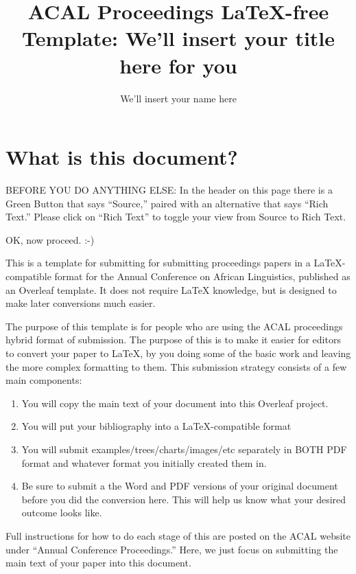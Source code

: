\documentclass[output=paper,colorlinks,citecolor=brown,
]{langscibook}
\author{We'll insert your name here\affiliation{We'll insert your affiliation here}}
\title{ACAL Proceedings LaTeX-free Template: We'll insert your title here for you}
\begin{document}
\maketitle


\section{What is this document?}

BEFORE YOU DO ANYTHING ELSE: In the header on this page there is a Green Button that says ``Source,'' paired with an alternative that says ``Rich Text.'' Please click on ``Rich Text'' to toggle your view from Source to Rich Text. 

OK, now proceed. :-) 

This is a template for submitting for submitting proceedings papers in a LaTeX-compatible format for the Annual Conference on African Linguistics, published as an Overleaf template. It does not require LaTeX knowledge, but is designed to make later conversions much easier.

The purpose of this template is for people who are using the ACAL proceedings hybrid format of submission. The purpose of this is to make it easier for editors to convert your paper to LaTeX, by you doing some of the basic work and leaving the more complex formatting to them. This submission strategy consists of a few main components: 
\begin{enumerate}
\item You will copy the main text of your document into this Overleaf project. 
\item You will put your bibliography into a LaTeX-compatible format
\item You will submit examples/trees/charts/images/etc separately in BOTH PDF format and whatever format you initially created them in. 
\item Be sure to submit a the Word and PDF versions of your original document before you did the conversion here. This will help us know what your desired outcome looks like. 

\end{enumerate}
Full instructions for how to do each stage of this are posted on the ACAL website under ``Annual Conference Proceedings.'' Here, we just focus on submitting the main text of your paper into this document.
\end{document}
